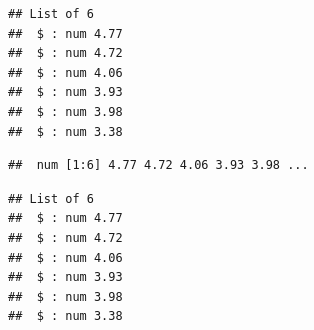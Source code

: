 \documentclass[krantz2]{krantz}\usepackage{knitr}
\begin{document}
\begin{knitrout}\footnotesize
{}\color{fgcolor}\begin{kframe}
\begin{alltt}
 \hlkwb{<-} \hlstd{(}\hlstd{,} \hlstd{) \{} \hlopt{+} 
\end{alltt}
\end{kframe}
\end{knitrout}

\begin{knitrout}\footnotesize
{}\color{fgcolor}\begin{kframe}
\begin{alltt}
 \hlkwb{<-} \hlstd{(}     \hlstd{=} \hlstd{)}
\end{alltt}
\begin{verbatim}
## List of 6
##  $ : num 4.77
##  $ : num 4.72
##  $ : num 4.06
##  $ : num 3.93
##  $ : num 3.98
##  $ : num 3.38
\end{verbatim}
\end{kframe}
\end{knitrout}

\begin{knitrout}\footnotesize
{}\color{fgcolor}\begin{kframe}
\begin{alltt}
 \hlkwb{<-} \hlstd{(}     \hlstd{=} \hlstd{)}
\end{alltt}
\begin{verbatim}
##  num [1:6] 4.77 4.72 4.06 3.93 3.98 ...
\end{verbatim}
\end{kframe}
\end{knitrout}

\begin{knitrout}\footnotesize
{}\color{fgcolor}\begin{kframe}
\begin{alltt}
 \hlkwb{<-} \hlstd{(}     \hlstd{=} \hlstd{,}  \hlstd{=} \hlstd{)}
\end{alltt}
\begin{verbatim}
## List of 6
##  $ : num 4.77
##  $ : num 4.72
##  $ : num 4.06
##  $ : num 3.93
##  $ : num 3.98
##  $ : num 3.38
\end{verbatim}
\end{kframe}
\end{knitrout}
\end{document}

